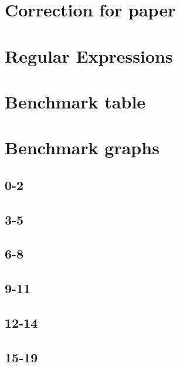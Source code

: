 \appendix

\section{Correction for paper}\label{sec:PaperCorrections}


\section{Regular Expressions}\label{sec:RegularExpressions}


\section{Benchmark table}\label{sec:BenchmarkTable}


\section{Benchmark graphs}\label{sec:BenchmarkGraphs}
\subsection{0-2}
\resizebox{\textwidth}{!}{
    
    
}
\subsection{3-5}
\resizebox{\textwidth}{!}{
    
    
}
\subsection{6-8}
\resizebox{\textwidth}{!}{
    
    
}
\subsection{9-11}
\resizebox{\textwidth}{!}{
    
    
}
\subsection{12-14}
\resizebox{\textwidth}{!}{
    
    
}
\subsection{15-19}
\resizebox{\textwidth}{!}{
    
    
}